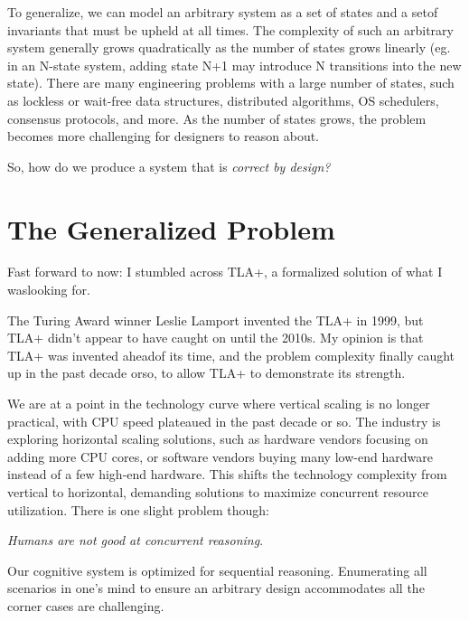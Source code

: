To generalize, we can model an arbitrary system as a set of states and a setof
invariants that must be upheld at all times. The complexity of such an arbitrary
system generally grows quadratically as the number of states grows linearly (eg.
in an N-state system, adding state N+1 may introduce N transitions into the new
state). There are many engineering problems with a large number of states, such
as lockless or wait-free data structures, distributed algorithms, OS schedulers,
consensus protocols, and more. As the number of states grows, the problem becomes
more challenging for designers to reason about.\newline

So, how do we produce a system that is \textit{correct by design?} 

\section{The Generalized Problem}

Fast forward to now: I stumbled across TLA+, a formalized solution of what I
waslooking for.\newline

The Turing Award winner Leslie Lamport invented the TLA+ in 1999, but TLA+
didn't appear to have caught on until the 2010s. My opinion is that TLA+ was
invented aheadof its time, and the problem complexity finally caught up in the
past decade orso, to allow TLA+ to demonstrate its strength.\newline

We are at a point in the technology curve where vertical scaling is no
longer practical, with CPU speed plateaued in the past decade or so. The industry
is exploring horizontal scaling solutions, such as hardware vendors focusing on
adding more CPU cores, or software vendors buying many low-end hardware instead
of a few high-end hardware. This shifts the technology complexity from vertical
to horizontal, demanding solutions to maximize concurrent resource
utilization. There is one slight problem though:\newline

\textit{Humans are not good at concurrent reasoning}. \newline

Our cognitive system is optimized for sequential reasoning. Enumerating
all scenarios in one's mind to ensure an arbitrary design accommodates all
the corner cases are challenging.\newline

